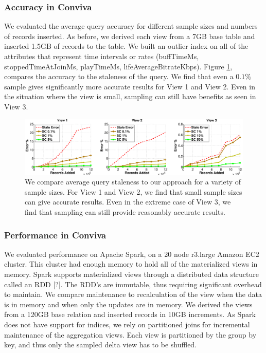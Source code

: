 \subsubsection{Accuracy in Conviva}
We evaluated the average query accuracy for different sample sizes and numbers of records inserted.
As before, we derived each view from a 7GB base table and inserted 1.5GB of records to the table. 
We built an outlier index on all of the attributes that represent time intervals or rates (buffTimeMs, stoppedTimeAtJoinMs, playTimeMs, lifeAverageBitrateKbps).
Figure \ref{exp5conviva}, compares the accuracy to the staleness of the query.
We find that even a $0.1\%$ sample gives significantly more accurate results for View 1 and View 2.
Even in the situation where the view is small, sampling can still have benefits as seen in View 3.

\begin{figure}[ht!]
\label{exp5conviva}
\hspace{-3.5em}
\includegraphics[scale=0.22]{exp/exp5-coniva-accuracy-woutlier.eps}
 \caption{We compare average query staleness to our approach for a variety of sample sizes. For View 1 and View 2, we find that small sample sizes can give accurate results. Even in the extreme case of View 3, we find that sampling can still provide reasonably accurate results.}
\end{figure}

\subsubsection{Performance in Conviva}
We evaluated performance on Apache Spark, on a 20 node r3.large Amazon EC2 cluster. 
This cluster had enough memory to hold all of the materialized views in memory.
Spark supports materialized views through a distributed data structure called an RDD [?].
The RDD's are immutable, thus requiring significant overhead to maintain.
We compare maintenance to recalculation of the view when the data is in memory and when only the updates are in memory. 
We derived the views from a 120GB base relation and inserted records in 10GB increments.
As Spark does not have support for indices, we rely on partitioned joins for incremental maintenance of the aggregation views.
Each view is partitioned by the group by key, and thus only the sampled delta view has to be shuffled. 

